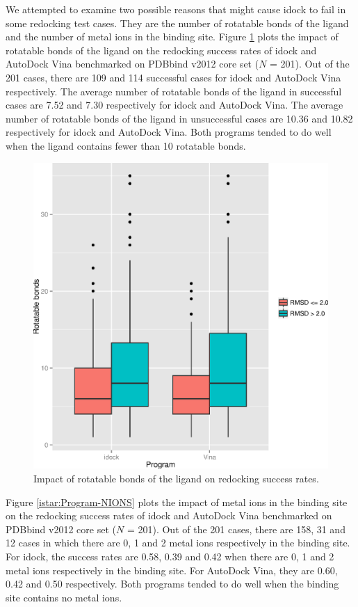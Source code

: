 We attempted to examine two possible reasons that might cause idock to fail in some redocking test cases. They are the number of rotatable bonds of the ligand and the number of metal ions in the binding site. Figure \ref{istar:Program-NRB} plots the impact of rotatable bonds of the ligand on the redocking success rates of idock and AutoDock Vina benchmarked on PDBbind v2012 core set ($N$ = 201). Out of the 201 cases, there are 109 and 114 successful cases for idock and AutoDock Vina respectively. The average number of rotatable bonds of the ligand in successful cases are 7.52 and 7.30 respectively for idock and AutoDock Vina. The average number of rotatable bonds of the ligand in unsuccessful cases are 10.36 and 10.82 respectively for idock and AutoDock Vina. Both programs tended to do well when the ligand contains fewer than 10 rotatable bonds.

\begin{figure}
\begin{center}
\includegraphics[width=\linewidth]{../istar/Program-NRB.eps}
\end{center}
\caption{Impact of rotatable bonds of the ligand on redocking success rates.}
\label{istar:Program-NRB}
\end{figure}

Figure \ref{istar:Program-NIONS} plots the impact of metal ions in the binding site on the redocking success rates of idock and AutoDock Vina benchmarked on PDBbind v2012 core set ($N$ = 201). Out of the 201 cases, there are 158, 31 and 12 cases in which there are 0, 1 and 2 metal ions respectively in the binding site. For idock, the success rates are 0.58, 0.39 and 0.42 when there are 0, 1 and 2 metal ions respectively in the binding site. For AutoDock Vina, they are 0.60, 0.42 and 0.50 respectively. Both programs tended to do well when the binding site contains no metal ions.

